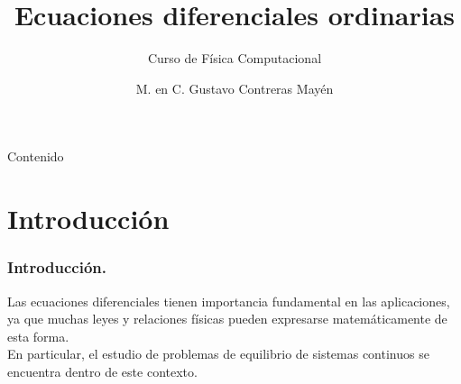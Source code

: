 

\title{Ecuaciones diferenciales ordinarias}
\subtitle{Curso de Física Computacional}
\author[]{M. en C. Gustavo Contreras Mayén}

\maketitle
\fontsize{14}{14}\selectfont
{}
\begin{frame}{Contenido}
\tableofcontents[pausesections]
\end{frame}
\section{Introducción}
\begin{frame}
\frametitle{Introducción.}
Las ecuaciones diferenciales tienen importancia fundamental en las aplicaciones, ya que muchas leyes y relaciones físicas pueden expresarse matemáticamente de esta forma.
\\
\medskip
En particular, el estudio de problemas de equilibrio de sistemas continuos se encuentra dentro de este contexto.
\end{frame}

